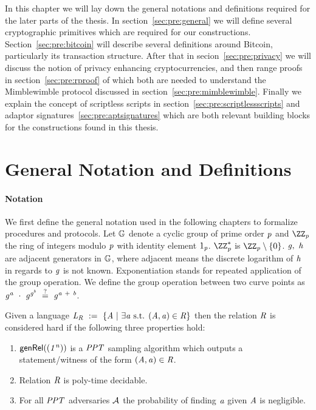In this chapter we will lay down the general notations and definitions required for the later parts of the thesis.
In section~\ref{sec:pre:general} we will define several cryptographic primitives which are required for our constructions.
Section~\ref{sec:pre:bitcoin} will describe several definitions around Bitcoin, particularly its transaction structure.
After that in secion~\ref{sec:pre:privacy} we will discuss the notion of privacy enhancing cryptocurrencies, and then range proofs in section~\ref{sec:pre:rproof} of which both are needed to understand the Mimblewimble protocol discussed in section~\ref{sec:pre:mimblewimble}.
Finally we explain the concept of scriptless scripts in section~\ref{sec:pre:scriptlessscripts} and adaptor signatures~\ref{sec:pre:aptsignatures} which are both relevant building blocks for the constructions found in this thesis.

\section{General Notation and Definitions\label{sec:pre:general}}

\paragraph{Notation}
We first define the general notation used in the following chapters to formalize procedures and protocols.
Let $\mathbb{G}$ denote a cyclic group of prime order $\mathit{p}$ and $\cnstIntegersPrime{\varPrime}$ the ring of integers modulo $\mathit{p}$ with identity element $1_{\mathit{p}}$.
$\cnstIntegersPrimeWithoutZero{\varPrime}$ is $\cnstIntegersPrime{\varPrime} \opExcluding \funList{0}$.
$\mathit{g} ,~ \mathit{h}$ are adjacent generators in $\mathbb{G}$, where adjacent means the discrete logarithm of $\mathit{h}$ in regards to $\mathit{g}$ is not known.
Exponentiation stands for repeated application of the group operation.
We define the group operation between two curve points as $\mathit{g}^{\mathit{a}} ~\cdot~ \mathit{g}^{\mathit{g}^{\mathit{b}}} ~\stackrel{?}{=}~ \mathit{g}^{\mathit{a} ~+~ \mathit{b}}$.

\begin{definition}\label{def:hardRelation}
    Given a language $\mathit{L}_{\mathit{R}} ~:=~ \{\mathit{A} ~|~ \exists\mathit{a} \text{ s.t. } (\mathit{A}, \mathit{a}) \in \mathit{R}\}$ then the relation $\mathit{R}$ is
    considered hard if the following three properties hold: \cite{aumayr2020bitcoinchannels}
    \begin{enumerate}
        \item $\mathsf{genRel}((\mathit{1^n}))$ is a $\mathit{PPT}$ sampling algorithm which outputs a statement/witness of the form $(\mathit{A}, \mathit{a}) \in \mathit{R}$.
        \item Relation $\mathit{R}$ is poly-time decidable.
        \item For all $\mathit{PPT}$ adversaries $\mathcal{A}$ the probability of finding $\mathit{a}$ given $\mathit{A}$ is negligible.
    \end{enumerate}
\end{definition}

